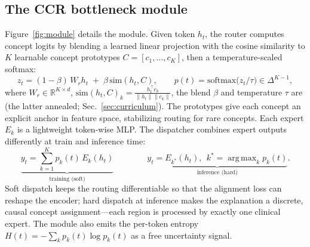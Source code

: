 \documentclass[runningheads]{llncs}
\DeclareMathOperator*{\argmax}{arg\,max}
\newcommand{\Rb}{\mathbb{R}}
\begin{document}
\subsection{The CCR bottleneck module}\label{sec:module}
Figure~\ref{fig:module} details the module. Given token $h_t$, the router computes
concept logits by blending a learned linear projection with the cosine similarity to $K$
learnable concept prototypes $C=[c_1,\dots,c_K]$, then a temperature-scaled softmax:
\begin{equation}
z_t = (1-\beta)\,W_r h_t \;+\; \beta\,\mathrm{sim}(h_t, C),
\qquad
p(t) = \mathrm{softmax}\!\big(z_t/\tau\big)\in\Delta^{K-1},
\label{eq:router}
\end{equation}
where $W_r\in\Rb^{K\times d}$, $\mathrm{sim}(h_t,C)_k=\frac{h_t^\top c_k}{\lVert h_t\rVert\lVert c_k\rVert}$,
the blend $\beta$ and temperature $\tau$ are (the latter annealed; Sec.~\ref{sec:curriculum}).
The prototypes give each concept an explicit anchor in feature space, stabilizing routing
for rare concepts. Each expert $E_k$ is a lightweight token-wise MLP. The dispatcher
combines expert outputs differently at train and inference time:
\begin{equation}
\underbrace{y_t = \sum_{k=1}^{K} p_k(t)\,E_k(h_t)}_{\text{training (soft)}}
\qquad\qquad
\underbrace{y_t = E_{k^\ast}(h_t),\ \ k^\ast=\argmax_k p_k(t)}_{\text{inference (hard)}}.
\label{eq:dispatch}
\end{equation}
Soft dispatch keeps the routing differentiable so that the alignment loss can reshape the
encoder; hard dispatch at inference makes the explanation a discrete, causal
concept assignment---each region is processed by exactly one clinical expert. The module
also emits the per-token entropy
$H(t)=-\sum_k p_k(t)\log p_k(t)$ as a free uncertainty signal.
\end{document}

